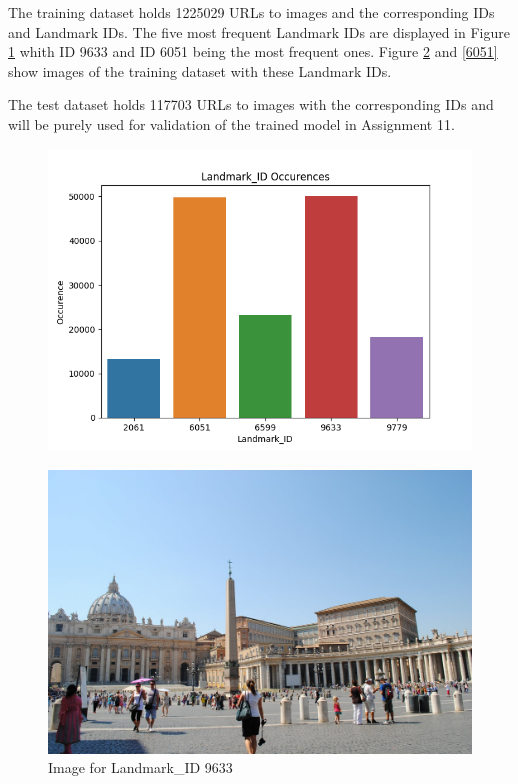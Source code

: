 The training dataset holds 1225029 URLs to images and the corresponding IDs and Landmark IDs. The five most frequent Landmark IDs are displayed in Figure \ref{landmark-ids} whith ID 9633 and ID 6051 being the most frequent ones. Figure \ref{9633} and \ref{6051} show images of the training dataset with these Landmark IDs.

The test dataset holds 117703 URLs to images with the corresponding IDs and will be purely used for validation of the trained model in Assignment 11.

\begin{figure}
	\includegraphics[width=\textwidth]{images/Landmark_ID_occurences}
	\label{landmark-ids}
\end{figure}
	
\begin{figure}
	\includegraphics[width=\textwidth]{images/9633}
	\caption{Image for Landmark\_ID 9633}
	\label{9633}
\end{figure}
	
